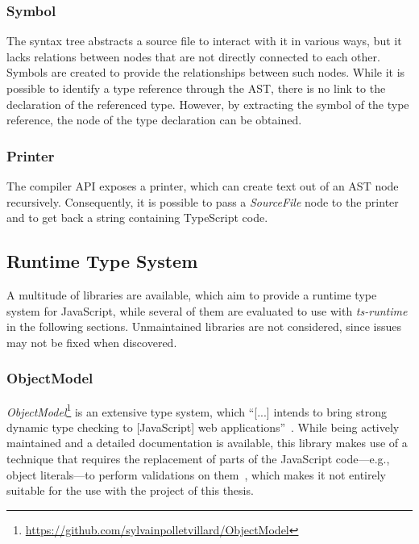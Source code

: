 \subsubsection{Symbol}

The syntax tree abstracts a source file to interact with it in various ways, but it lacks relations between nodes that are not directly connected to each other. Symbols are created to provide the relationships between such nodes. While it is possible to identify a type reference through the AST, there is no link to the declaration of the referenced type. However, by extracting the symbol of the type reference, the node of the type declaration can be obtained.

\subsubsection{Printer}

The compiler API exposes a printer, which can create text out of an AST node recursively. Consequently, it is possible to pass a \emph{SourceFile} node to the printer and to get back a string containing TypeScript code.

\subsection{Runtime Type System}
\label{sec:runtime-type-system}

A multitude of libraries are available, which aim to provide a runtime type system for JavaScript, while several of them are evaluated to use with \emph{ts-runtime} in the following sections. Unmaintained libraries are not considered, since issues may not be fixed when discovered.

\subsubsection{ObjectModel}

\emph{ObjectModel}\footnote{\url{https://github.com/sylvainpolletvillard/ObjectModel}} is an extensive type system, which ``[...] intends to bring strong dynamic type checking to [JavaScript] web applications''~\cite{RuntimeTypeSystem:ObjectModel}. While being actively maintained and a detailed documentation is available, this library makes use of a technique that requires the replacement of parts of the JavaScript code---e.g., object literals---to perform validations on them~\cite{RuntimeTypeSystem:ObjectModel}, which makes it not entirely suitable for the use with the project of this thesis.


